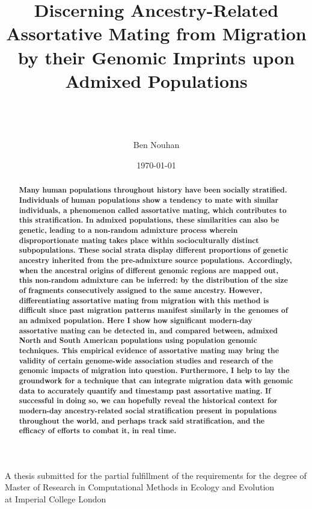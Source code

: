 \documentclass[11pt]{article}
\title{Discerning Ancestry-Related Assortative Mating from Migration by their Genomic Imprints upon Admixed Populations}
\author{\\ \\ \\ Ben Nouhan}
\date{\today}
\begin{document}
\maketitle
\vspace{8mm}


\begin{center}
\small{A thesis submitted for the partial fulfillment of the requirements for the degree of Master of Research in Computational Methods in Ecology and Evolution \\ at Imperial College London}
\end{center} 


\vspace{7mm}
\onehalfspacing
\renewcommand{\abstractname}{\vspace{-\baselineskip}} %
\begin{abstract}
    \linenumbers
    \small
    \noindent
    \textbf{
        Many human populations throughout history have been socially stratified. Individuals of human populations show a tendency to mate with similar individuals, a phenomenon called assortative mating, which contributes to this stratification. In admixed populations, these similarities can also be genetic, leading to a non-random admixture process wherein disproportionate mating takes place within socioculturally distinct subpopulations. These social strata display different proportions of genetic ancestry inherited from the pre-admixture source populations. Accordingly, when the ancestral origins of different genomic regions are mapped out, this non-random admixture can be inferred: by the distribution of the size of fragments consecutively assigned to the same ancestry. However, differentiating assortative mating from migration with this method is difficult since past migration patterns manifest similarly in the genomes of an admixed population. Here I show how significant modern-day assortative mating can be detected in, and compared between, admixed North and South American populations using population genomic techniques. This empirical evidence of assortative mating may bring the validity of certain genome-wide association studies and research of the genomic impacts of migration into question. Furthermore, I help to lay the groundwork for a technique that can integrate migration data with genomic data to accurately quantify and timestamp past assortative mating. If successful in doing so, we can hopefully reveal the historical context for modern-day ancestry-related social stratification present in populations throughout the world, and perhaps track said stratification, and the efficacy of efforts to combat it, in real time.
    }
\end{abstract}
\end{document}

